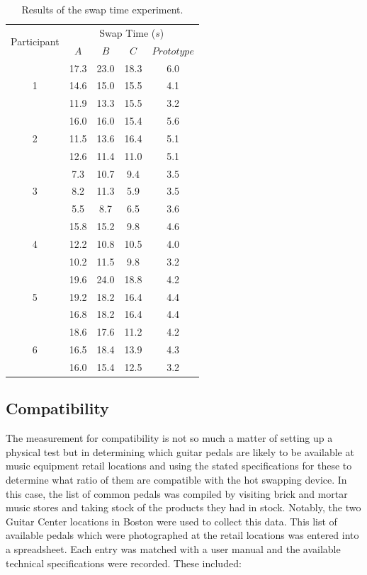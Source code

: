 \documentclass{article}
\begin{document}
	\begin{table}
	\begin{center}
	\begin{tabular}{ |c|c c c c| }
	\hline
	\multirow{2}{*}{Participant} 	& \multicolumn{4}{|c|}{Swap Time ($s$)} \\
									& $A$ & $B$ & $C$ & $Prototype$ \\
	\hline
	\multirow{3}{*}{1}				& 17.3 & 23.0 & 18.3 & 6.0 \\
									& 14.6 & 15.0 & 15.5 & 4.1 \\
									& 11.9 & 13.3 & 15.5 & 3.2 \\
	\multirow{3}{*}{2}				& 16.0 & 16.0 & 15.4 & 5.6 \\
									& 11.5 & 13.6 & 16.4 & 5.1 \\
									& 12.6 & 11.4 & 11.0 & 5.1 \\
	\multirow{3}{*}{3}				&  7.3 & 10.7 &  9.4 & 3.5 \\
									&  8.2 & 11.3 &  5.9 & 3.5 \\
									&  5.5 &  8.7 &  6.5 & 3.6 \\
	\multirow{3}{*}{4}				& 15.8 & 15.2 &  9.8 & 4.6 \\
									& 12.2 & 10.8 & 10.5 & 4.0 \\
									& 10.2 & 11.5 &  9.8 & 3.2 \\
	\multirow{3}{*}{5}				& 19.6 & 24.0 & 18.8 & 4.2 \\
									& 19.2 & 18.2 & 16.4 & 4.4 \\
									& 16.8 & 18.2 & 16.4 & 4.4 \\
	\multirow{3}{*}{6}				& 18.6 & 17.6 & 11.2 & 4.2 \\
									& 16.5 & 18.4 & 13.9 & 4.3 \\
									& 16.0 & 15.4 & 12.5 & 3.2 \\
	\hline
	\end{tabular}
	\caption{Results of the swap time experiment.}
	\label{tab:SwapTestResults}
	\end{center}
	\end{table}


	\color{gray}


	\subsection{Compatibility}
	The measurement for compatibility is not so much a matter of setting up a physical test but in determining which guitar pedals are likely to be available at music equipment retail locations and using the stated specifications for these to determine what ratio of them are compatible with the hot swapping device.  In this case, the list of common pedals was compiled by visiting brick and mortar music stores and taking stock of the products they had in stock.  Notably, the two Guitar Center locations in Boston were used to collect this data.  This list of available pedals which were photographed at the retail locations was entered into a spreadsheet.  Each entry was matched with a user manual and the available technical specifications were recorded.  These included:
\end{document}
